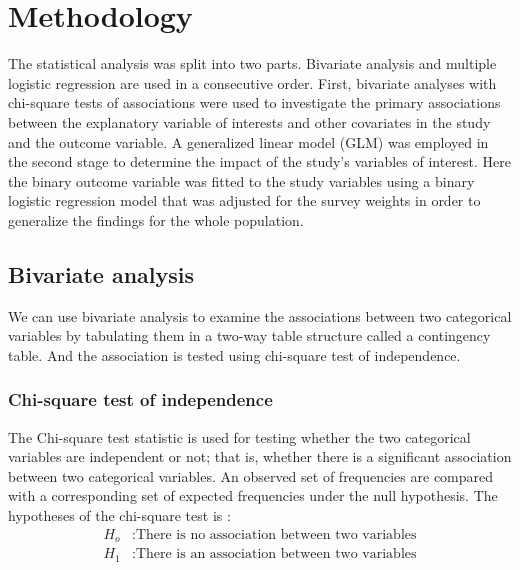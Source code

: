 \documentclass[
  12pt,
  oneside]{report}
\begin{document}
\newpage

\hypertarget{methodology}{%
\chapter{Methodology}\label{methodology}}

The statistical analysis was split into two parts. Bivariate analysis and multiple logistic regression are used in a consecutive order. First, bivariate analyses with chi-square tests of associations were used to investigate the primary associations between the explanatory variable of interests and other covariates in the study and the outcome variable. A generalized linear model (GLM) was employed in the second stage to determine the impact of the study's variables of interest. Here the binary outcome variable was fitted to the study variables using a binary logistic regression model that was adjusted for the survey weights in order to generalize the findings for the whole population.

\hypertarget{bivariate-analysis}{%
\section{Bivariate analysis}\label{bivariate-analysis}}

We can use bivariate analysis to examine the associations between two categorical variables by tabulating them in a two-way table structure called a contingency table. And the association is tested using chi-square test of independence.

\hypertarget{chi-square-test-of-independence}{%
\subsection{Chi-square test of independence}\label{chi-square-test-of-independence}}

The Chi-square test statistic is used for testing whether the two categorical variables are independent or not; that is, whether there is a significant association between two categorical variables. An observed set of frequencies are compared with a corresponding set of expected frequencies under the null hypothesis. The hypotheses of the chi-square test is :
\begin{align*}
H_o&: \text{There is no association between two variables} \\
H_1&: \text{There is an association between two variables}
\end{align*}
\end{document}
